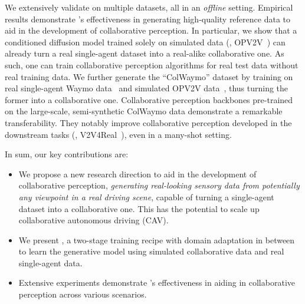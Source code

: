 We extensively validate \ours on multiple datasets, all in an \emph{offline} setting. Empirical results demonstrate \ours's effectiveness in generating high-quality reference data to aid in the development of collaborative perception. In particular, we show that a conditioned diffusion model trained solely on simulated data (\eg, OPV2V~\citep{xu2022opv2v}) can already turn a real single-agent dataset into a real-alike collaborative one. As such, one can train collaborative perception algorithms for real test data without real training data. We further generate the ``ColWaymo'' dataset by training \ours on real single-agent Waymo data~\citep{sun2020waymo} and simulated OPV2V data~\citep{xu2022opv2v}, thus turning the former into a collaborative one. Collaborative perception backbones pre-trained on the large-scale, semi-synthetic ColWaymo data demonstrate a remarkable transferability. They notably improve collaborative perception developed in the downstream tasks (\eg, V2V4Real~\citep{xu2023v2v4real}), even in a many-shot setting.  

In sum, our key contributions are:
\begin{itemize}
\item We propose a new research direction to aid in the development of collaborative perception, \emph{generating real-looking sensory data from potentially any viewpoint in a real driving scene}, capable of turning a single-agent dataset into a collaborative one. This has the potential to scale up collaborative autonomous driving (CAV).
\item We present \ours, a two-stage training recipe with domain adaptation in between to learn the generative model using simulated collaborative data and real single-agent data.
\item Extensive experiments demonstrate \ours's effectiveness in aiding in collaborative perception across various scenarios.
\end{itemize}
